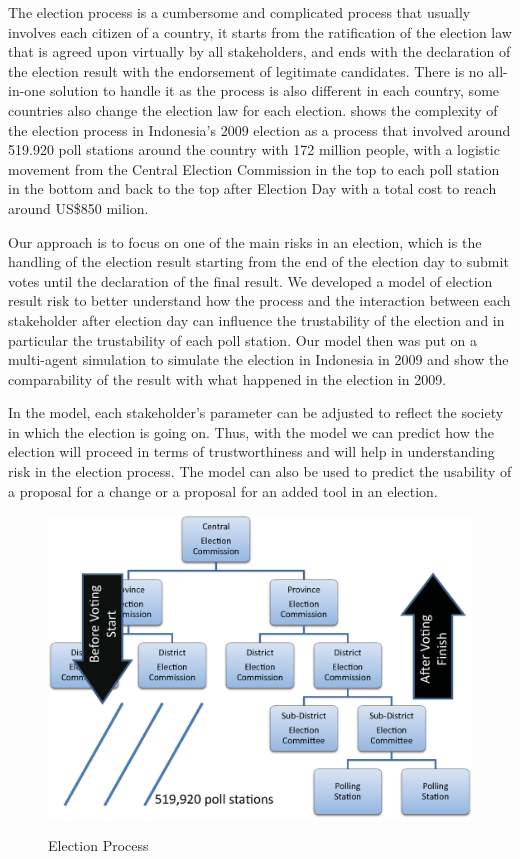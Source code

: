 \documentclass[JIP]{ipsj}
\begin{document}
The election process is a cumbersome and complicated process that usually involves each citizen of a country, it starts from the ratification of the election law that is agreed upon virtually by all stakeholders, and ends with the declaration of the election result with the endorsement of legitimate candidates. There is no all-in-one solution to handle it as the process is also different in each country, some countries also change the election law for each election.  shows the complexity of the election process in Indonesia's 2009 election as a process that involved around 519.920 poll stations around the country with 172 million people, with a logistic movement from the Central Election Commission in the top to each poll station in the bottom and back to the top after Election Day with a total cost to reach around US\$850 milion.

Our approach is to focus on one of the main risks in an election, which is the handling of the election result starting from the end of the election day to submit votes until the declaration of the final result. We developed a model of election result risk to better understand how the process and the interaction between each stakeholder after election day can influence the trustability of the election and in particular the trustability of each poll station. Our model then was put on a multi-agent simulation to simulate the election in Indonesia in 2009 and show the comparability of the result with what happened in the election in 2009.

In the model, each stakeholder's parameter can be adjusted to reflect the society in which the election is going on. Thus, with the model we can predict how the election will proceed in terms of trustworthiness and will help in understanding risk in the election process. The model can also be used to predict the usability of a proposal for a change or a proposal for an added tool in an election.

\begin{figure}[tb]%
\vbox{\it
  \hbox{\includegraphics[scale=0.4]{images/ElectionComplexity.eps}}}
\centerline{}
\caption{Election Process}
\label{fig:ecomplex}
\end{figure}
\end{document}
